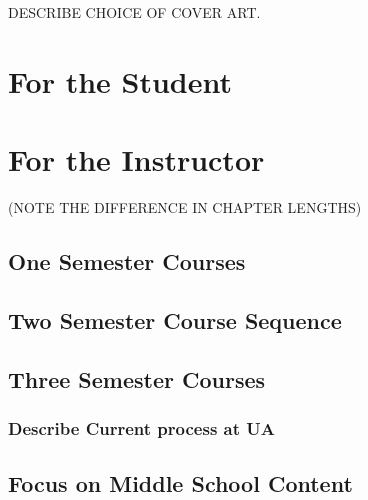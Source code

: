 \documentclass[
]{book}
\let\stdsection\section
\renewcommand\section{\newpage\stdsection}
\theoremstyle{definition}
\theoremstyle{definition}
\theoremstyle{definition}
\theoremstyle{definition}
\theoremstyle{remark}
\begin{document}
DESCRIBE CHOICE OF COVER ART.

\hypertarget{for-the-student}{%
\section*{For the Student}\label{for-the-student}}

\hypertarget{for-the-instructor}{%
\section*{For the Instructor}\label{for-the-instructor}}

(NOTE THE DIFFERENCE IN CHAPTER LENGTHS)

\hypertarget{one-semester-courses}{%
\subsection*{One Semester Courses}\label{one-semester-courses}}

\hypertarget{two-semester-course-sequence}{%
\subsection*{Two Semester Course Sequence}\label{two-semester-course-sequence}}

\hypertarget{three-semester-courses}{%
\subsection*{Three Semester Courses}\label{three-semester-courses}}

\hypertarget{describe-current-process-at-ua}{%
\subsubsection*{Describe Current process at UA}\label{describe-current-process-at-ua}}

\hypertarget{focus-on-middle-school-content}{%
\subsection*{Focus on Middle School Content}\label{focus-on-middle-school-content}}
\end{document}
